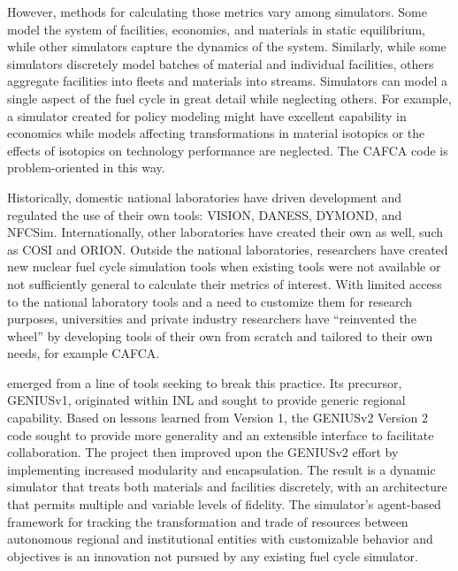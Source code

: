 However, methods for calculating those metrics vary among simulators. Some
model the system of facilities, economics, and materials in static equilibrium,
while other simulators capture the dynamics of the system.  Similarly, while
some simulators discretely model batches of material and individual facilities,
others aggregate facilities into fleets and materials into streams. Simulators
can model a single aspect of the fuel cycle in great detail while neglecting
others. For example, a simulator created for policy modeling might have
excellent capability in economics while models affecting transformations in
material isotopics or the effects of isotopics on technology performance are
neglected.  The \gls{CAFCA}\cite{guerin_impact_2009} code is problem-oriented
in this way.

Historically, domestic national laboratories have driven development and regulated
the use of their own tools: \gls{VISION}\cite{jacobson_verifiable_2010},
\gls{DANESS}\cite{van_den_durpel_daness_2009},
\gls{DYMOND}\cite{yacout_modeling_2005}, and
\gls{NFCSim}\cite{schneider_nfcsim:_2005}.
Internationally, other laboratories have created their own as well, such as
\gls{COSI}\cite{boucher_cosi_2005,boucher_cosi:_2006,meyer_new_2009,coquelet-pascal_comparison_2011}
and
\gls{ORION}\cite{worrall_scenario_2007}.
Outside the national laboratories,
researchers have created new nuclear fuel cycle simulation tools when existing
tools were not available or not sufficiently general to calculate their metrics
of interest.  With limited access to the national
laboratory tools and a need to customize them for research purposes,
universities and private industry researchers have ``reinvented the wheel'' by
developing tools of their own from scratch and tailored to their own needs, for
example \gls{CAFCA}\cite{guerin_impact_2009}.

\Cyclus emerged from a line of tools seeking to break this practice.  Its
precursor,
\gls{GENIUSv1}\cite{dunzik-gougar_global_2007,jain_transitioning_2006},
originated within \gls{INL} and sought to provide generic regional capability.
Based on lessons learned from Version 1, the \acrshort{GENIUSv2} Version
2\cite{oliver_studying_2009,huff_geniusv2_2009} code sought to provide more
generality and an extensible interface to facilitate collaboration.  The
\Cyclus project then improved upon the \acrshort{GENIUSv2} effort by
implementing increased modularity and encapsulation.  The result is a dynamic
simulator that treats both materials and facilities discretely, with an
architecture that permits multiple and variable levels of fidelity. The
simulator's agent-based framework for tracking the transformation and trade of
resources between autonomous regional and institutional entities with
customizable behavior and objectives is an innovation not pursued by any
existing fuel cycle simulator.

